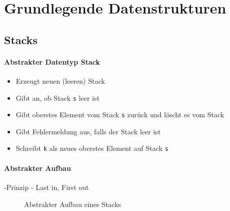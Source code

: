 \documentclass[
    ngerman,
    color=3b,
    load_common, %
    summary,
    boxarc,
]{tuda_summary}
\begin{document}
\section{Grundlegende Datenstrukturen}
\subsection{Stacks}\label{Stacks}
\paragraph{Abstrakter Datentyp Stack}
\begin{description}[leftmargin=3cm,itemsep=1em]
    \item [\texttt{new S()}]
          \begin{itemize}
              \item Erzeugt neuen (leeren) Stack
          \end{itemize}
    \item [\texttt{s.isEmpty()}]
          \begin{itemize}
              \item Gibt an, ob Stack \texttt{s} leer ist
          \end{itemize}
    \item [\texttt{s.pop()}]
          \begin{itemize}
              \item Gibt oberstes Element vom Stack \texttt{s} zurück und löscht es vom Stack
              \item Gibt Fehlermeldung aus, falls der Stack leer ist
          \end{itemize}
    \item [\texttt{s.push(k)}]
          \begin{itemize}
              \item Schreibt \texttt{k} als neues oberstes Element auf Stack \texttt{s}
          \end{itemize}
\end{description}
\paragraph{Abstrakter Aufbau}\mbox{}
-Prinzip - Last in, First out
\begin{figure}[ht]
    \centering
    
    \caption{Abstrakter Aufbau eines Stacks}
    \label{fig:lifo}
\end{figure}
\end{document}
